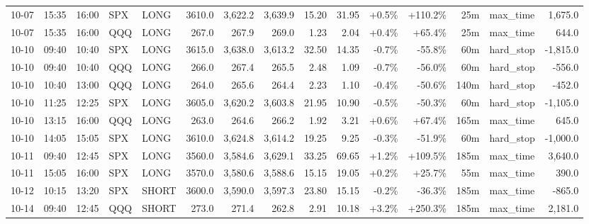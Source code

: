 \documentclass[11pt,a4paper,twoside]{article}
\begin{document}
\begin{landscape}
\begin{center}
\begin{longtable}{>{\color{txtmain}}l l l l l r r r r r r r r >{\color{txtmain}}l r}
10-07 & 15:35 & 16:00 & SPX & LONG & 3610.0 & 3,622.2 & 3,639.9 & 15.20 & 31.95 & \textcolor{wingreen}{+0.5\%} & \textcolor{wingreen}{+110.2\%} & 25m & max\_time & \textcolor{wingreen}{1,675.0} \\
10-07 & 15:35 & 16:00 & QQQ & LONG & 267.0 & 267.9 & 269.0 & 1.23 & 2.04 & \textcolor{wingreen}{+0.4\%} & \textcolor{wingreen}{+65.4\%} & 25m & max\_time & \textcolor{wingreen}{644.0} \\
10-10 & 09:40 & 10:40 & SPX & LONG & 3615.0 & 3,638.0 & 3,613.2 & 32.50 & 14.35 & \textcolor{lossred}{-0.7\%} & \textcolor{lossred}{-55.8\%} & 60m & hard\_stop & \textcolor{lossred}{-1,815.0} \\
10-10 & 09:40 & 10:40 & QQQ & LONG & 266.0 & 267.4 & 265.5 & 2.48 & 1.09 & \textcolor{lossred}{-0.7\%} & \textcolor{lossred}{-56.0\%} & 60m & hard\_stop & \textcolor{lossred}{-556.0} \\
10-10 & 10:40 & 13:00 & QQQ & LONG & 264.0 & 265.6 & 264.4 & 2.23 & 1.10 & \textcolor{lossred}{-0.4\%} & \textcolor{lossred}{-50.6\%} & 140m & hard\_stop & \textcolor{lossred}{-452.0} \\
10-10 & 11:25 & 12:25 & SPX & LONG & 3605.0 & 3,620.2 & 3,603.8 & 21.95 & 10.90 & \textcolor{lossred}{-0.5\%} & \textcolor{lossred}{-50.3\%} & 60m & hard\_stop & \textcolor{lossred}{-1,105.0} \\
10-10 & 13:15 & 16:00 & QQQ & LONG & 263.0 & 264.6 & 266.2 & 1.92 & 3.21 & \textcolor{wingreen}{+0.6\%} & \textcolor{wingreen}{+67.4\%} & 165m & max\_time & \textcolor{wingreen}{645.0} \\
10-10 & 14:05 & 15:05 & SPX & LONG & 3610.0 & 3,624.8 & 3,614.2 & 19.25 & 9.25 & \textcolor{lossred}{-0.3\%} & \textcolor{lossred}{-51.9\%} & 60m & hard\_stop & \textcolor{lossred}{-1,000.0} \\
10-11 & 09:40 & 12:45 & SPX & LONG & 3560.0 & 3,584.6 & 3,629.1 & 33.25 & 69.65 & \textcolor{wingreen}{+1.2\%} & \textcolor{wingreen}{+109.5\%} & 185m & max\_time & \textcolor{wingreen}{3,640.0} \\
10-11 & 15:05 & 16:00 & SPX & LONG & 3570.0 & 3,580.6 & 3,588.6 & 15.15 & 19.05 & \textcolor{wingreen}{+0.2\%} & \textcolor{wingreen}{+25.7\%} & 55m & max\_time & \textcolor{wingreen}{390.0} \\
10-12 & 10:15 & 13:20 & SPX & SHORT & 3600.0 & 3,590.0 & 3,597.3 & 23.80 & 15.15 & \textcolor{lossred}{-0.2\%} & \textcolor{lossred}{-36.3\%} & 185m & max\_time & \textcolor{lossred}{-865.0} \\
10-14 & 09:40 & 12:45 & QQQ & SHORT & 273.0 & 271.4 & 262.8 & 2.91 & 10.18 & \textcolor{wingreen}{+3.2\%} & \textcolor{wingreen}{+250.3\%} & 185m & max\_time & \textcolor{wingreen}{2,181.0} \\

\end{longtable}
\end{center}
\end{landscape}
\end{document}
